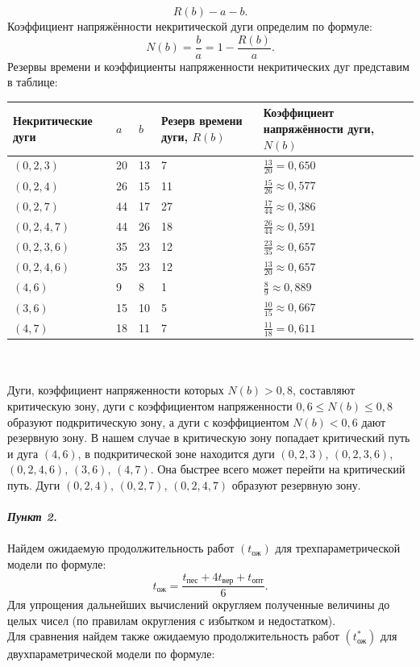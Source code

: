 \documentclass[a4paper, 12pt]{report}
\renewcommand{\leq}{\leqslant}
\begin{document}
	$$R(b)-a-b.$$
	Коэффициент напряжённости некритической дуги определим по формуле:
	$$N(b)=\frac{b}{a}=1-\frac{R(b)}{a}.$$
	Резервы времени и коэффициенты напряженности некритических
	дуг представим в таблице: \\
	\begin{tabular}{ |p{3cm}||p{1cm}||p{1cm}||p{4cm}||p{4cm}|}
		\hline
		Некритические дуги& $a$ & $b$ & Резерв времени дуги, $R(b)$ & Коэффициент напряжённости дуги, $N(b)$\\
		\hline
		$(0,2,3)$ & 20 & 13 & 7 & $\frac{13}{20}=0,650$\\
		$(0,2,4)$&26&15&11&$\frac{15}{26}\approx0,577$\\
		$(0,2,7)$&44&17&27&$\frac{17}{44}\approx0,386$\\
		$(0,2,4,7)$&44&26&18&$\frac{26}{44}\approx0,591$\\
		$(0,2,3,6)$&35&23&12&$\frac{23}{35}\approx0,657$\\
		$(0,2,4,6)$&35&23&12&$\frac{13}{20}\approx0,657$\\
		$(4,6)$&9&8&1&$\frac{8}{9}\approx0,889$\\
		$(3,6)$&15&10&5&$\frac{10}{15}\approx0,667$\\
		$(4,7)$&18&11&7&$\frac{11}{18}=0,611$\\
		\hline
	\end{tabular}\\\\
	Дуги, коэффициент напряженности которых $N(b) > 0,8$, составляют критическую зону, дуги с коэффициентом напряженности
	$0,6 \leq N(b) \leq 0,8$ образуют подкритическую зону, а дуги с коэффициентом $N(b) < 0,6$ дают резервную зону. В нашем случае в критическую зону попадает критический путь и дуга $(4,6)$, в подкритической зоне
	находится дуги $(0,2,3)$, $(0,2,3,6)$, $(0,2,4,6)$, $(3,6)$, $(4,7)$. Она быстрее
	всего может перейти на критический путь. Дуги $(0,2,4)$, $(0,2,7)$, $(0,2,4,7)$ образуют резервную зону.\\\\
	\textbf{\textit{Пункт 2.}}\\\\
	Найдем ожидаемую продолжительность работ $(t_\text{ож})$ для трехпараметрической модели по формуле:
	$$t_\text{ож}=\frac{t_\text{пес}+4t_\text{вер}+t_\text{опт}}{6}.$$
	Для упрощения дальнейших вычислений округляем полученные
	величины до целых чисел (по правилам округления с избытком и недостатком).\\
	Для сравнения найдем также ожидаемую продолжительность работ $(t_\text{
		ож}^*)$ для двухпараметрической модели по формуле:
\end{document}
